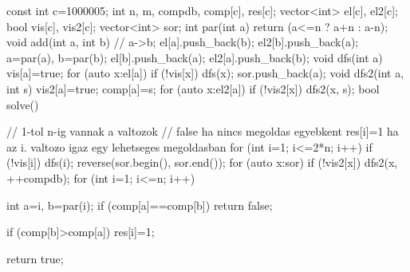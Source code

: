 const int c=1000005;
int n, m, compdb, comp[c], res[c];
vector<int> el[c], el2[c];
bool vis[c], vis2[c];
vector<int> sor;
int par(int a) {
    return (a<=n ? a+n : a-n);
}
void add(int a, int b) {
    // a->b;
    el[a].push_back(b);
    el2[b].push_back(a);
    a=par(a), b=par(b);
    el[b].push_back(a);
    el2[a].push_back(b);
}
void dfs(int a) {
    vis[a]=true;
    for (auto x:el[a]) {
        if (!vis[x]) {
            dfs(x);
        }
    }
    sor.push_back(a);
}
void dfs2(int a, int s) {
    vis2[a]=true;
    comp[a]=s;
    for (auto x:el2[a]) {
        if (!vis2[x]) {
            dfs2(x, s);
        }
    }
}
bool solve() {
    // 1-tol n-ig vannak a valtozok
    // false ha nincs megoldas egyebkent res[i]=1 ha az i. valtozo igaz egy lehetseges megoldasban
    for (int i=1; i<=2*n; i++) {
        if (!vis[i]) {
            dfs(i);
        }
    }
    reverse(sor.begin(), sor.end());
    for (auto x:sor) {
        if (!vis2[x]) {
            dfs2(x, ++compdb);
        }
    }
    for (int i=1; i<=n; i++) {
        int a=i, b=par(i);
        if (comp[a]==comp[b]) {
            return false;
        }

        if (comp[b]>comp[a]) {
            res[i]=1;
        }
    }
    return true;
}